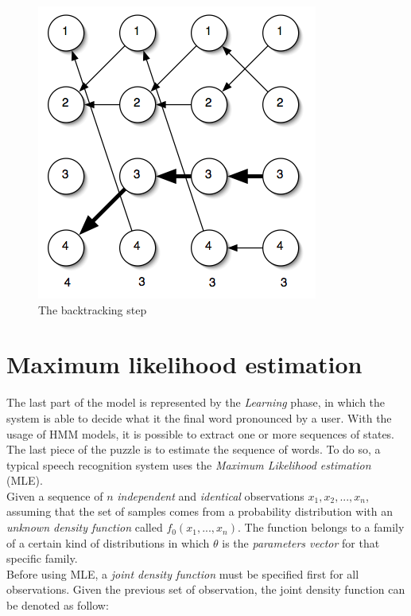 \begin{figure}[!ht]
	\centering
	\includegraphics[scale=0.8]{Figures/hmm_backtrack.png}
	\caption{The backtracking step \cite{hmm_tutorial}}
	\label{fig:hmm_backtrack}
\end{figure}


\section{Maximum likelihood estimation}
\label{sec:mle}
The last part of the model is represented by the \textit{Learning} phase, in which the system is able to decide what it the final word pronounced by a user. With the usage of HMM models, it is possible to extract one or more sequences of states. The last piece of the puzzle is to estimate the sequence of words. To do so, a typical speech recognition system uses the \textit{Maximum Likelihood estimation} (MLE). \\

\noindent Given a sequence of $n$ \textit{independent} and \textit{identical} observations $x_{1}, x_{2}, ... , x_{n}$, assuming that the set of samples comes from a probability distribution with an \textit{unknown density function} called $f_{0}(x_{1}, ... , x_{n})$. The function belongs to a family of a certain kind of distributions in which $\theta$ is the \textit{parameters vector} for that specific family. \\

\noindent Before using MLE, a \textit{joint density function} must be specified first for all observations. Given the previous set of observation, the joint density function can be denoted as follow:

